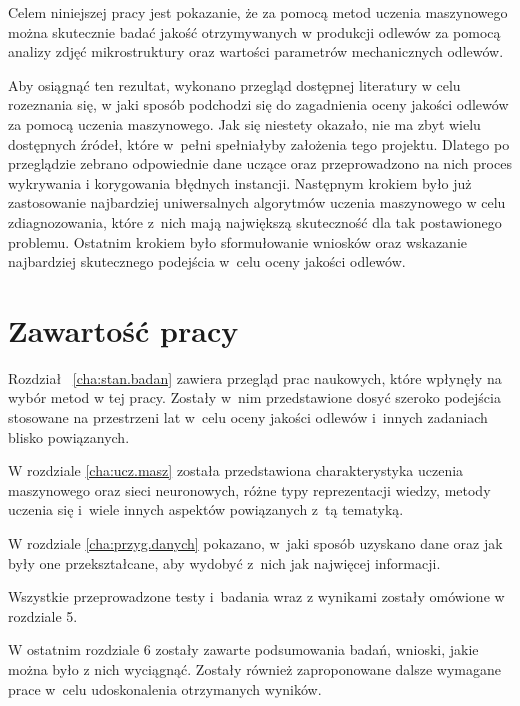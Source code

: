 Celem niniejszej pracy jest pokazanie, że za pomocą metod uczenia maszynowego można skutecznie badać jakość otrzymywanych w produkcji odlewów za pomocą analizy zdjęć mikrostruktury oraz wartości parametrów mechanicznych odlewów. 

Aby osiągnąć ten rezultat, wykonano przegląd dostępnej literatury w celu rozeznania się, w jaki sposób podchodzi się do zagadnienia oceny jakości odlewów za pomocą uczenia maszynowego. Jak się niestety okazało, nie ma zbyt wielu dostępnych źródeł, które w~pełni spełniałyby założenia tego projektu. Dlatego po przeglądzie zebrano odpowiednie dane uczące oraz przeprowadzono na nich proces wykrywania i korygowania błędnych instancji. Następnym krokiem było już zastosowanie najbardziej uniwersalnych algorytmów uczenia maszynowego w celu zdiagnozowania, które z~nich mają największą skuteczność dla tak postawionego problemu. Ostatnim krokiem było sformułowanie wniosków oraz wskazanie najbardziej skutecznego podejścia w~celu oceny jakości odlewów.



\section{Zawartość pracy}
\label{sec:zawartosc}

Rozdział ~\ref{cha:stan.badan} zawiera przegląd prac naukowych, które wpłynęły na wybór metod w tej pracy. Zostały w~nim przedstawione dosyć szeroko podejścia stosowane na przestrzeni lat w~celu oceny jakości odlewów i~innych zadaniach blisko powiązanych. 

W rozdziale \ref{cha:ucz.masz} została przedstawiona charakterystyka uczenia maszynowego oraz sieci neuronowych, różne typy reprezentacji wiedzy, metody uczenia się i~wiele innych aspektów powiązanych z~tą tematyką. 

W rozdziale \ref{cha:przyg.danych} pokazano, w~jaki sposób uzyskano dane oraz jak były one przekształcane, aby wydobyć z~nich jak najwięcej informacji. 

Wszystkie przeprowadzone testy i~badania wraz z wynikami zostały omówione w rozdziale 5. 

W ostatnim rozdziale 6 zostały zawarte podsumowania badań, wnioski, jakie można było z nich wyciągnąć. Zostały również zaproponowane dalsze wymagane prace w~celu udoskonalenia otrzymanych wyników.













